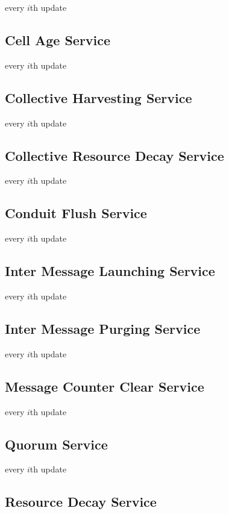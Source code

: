 every $i$th update

\subsection{Cell Age Service}

every $i$th update

\subsection{Collective Harvesting Service}

every $i$th update

\subsection{Collective Resource Decay Service}

every $i$th update

\subsection{Conduit Flush Service}

every $i$th update

\subsection{Inter Message Launching Service}

every $i$th update

\subsection{Inter Message Purging Service}

every $i$th update

\subsection{Message Counter Clear Service}

every $i$th update

\subsection{Quorum Service}

every $i$th update

\subsection{Resource Decay Service}

